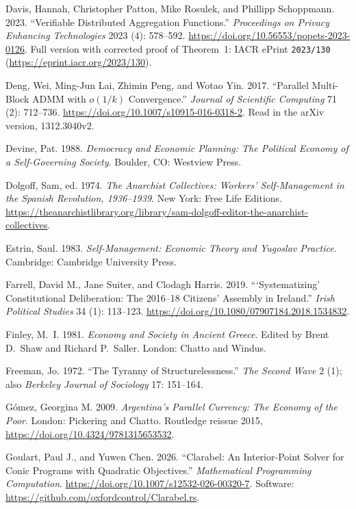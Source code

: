 \documentclass[10pt,twoside,openany]{book}
\theoremstyle{dpepstyle}
\begin{document}
\begin{list}{}{\setlength{\leftmargin}{1.8em}\setlength{\itemindent}{-1.8em}\setlength{\itemsep}{3pt}\setlength{\parsep}{0pt}}
\item Davis, Hannah, Christopher Patton, Mike Rosulek, and Phillipp Schoppmann. 2023. ``Verifiable Distributed Aggregation Functions.'' \emph{Proceedings on Privacy Enhancing Technologies} 2023 (4): 578--592. \url{https://doi.org/10.56553/popets-2023-0126}. Full version with corrected proof of Theorem~1: IACR ePrint \texttt{2023/130} (\url{https://eprint.iacr.org/2023/130}).
\item Deng, Wei, Ming-Jun Lai, Zhimin Peng, and Wotao Yin. 2017. ``Parallel Multi-Block ADMM with $o(1/k)$ Convergence.'' \emph{Journal of Scientific Computing} 71 (2): 712--736. \url{https://doi.org/10.1007/s10915-016-0318-2}. Read in the arXiv version, 1312.3040v2.
\item Devine, Pat. 1988. \emph{Democracy and Economic Planning: The Political Economy of a Self-Governing Society}. Boulder, CO: Westview Press.
\item Dolgoff, Sam, ed. 1974. \emph{The Anarchist Collectives: Workers' Self-Management in the Spanish Revolution, 1936--1939}. New York: Free Life Editions. \url{https://theanarchistlibrary.org/library/sam-dolgoff-editor-the-anarchist-collectives}.
\item Estrin, Saul. 1983. \emph{Self-Management: Economic Theory and Yugoslav Practice}. Cambridge: Cambridge University Press.
\item Farrell, David M., Jane Suiter, and Clodagh Harris. 2019. ```Systematizing' Constitutional Deliberation: The 2016--18 Citizens' Assembly in Ireland.'' \emph{Irish Political Studies} 34 (1): 113--123. \url{https://doi.org/10.1080/07907184.2018.1534832}.
\item Finley, M.~I. 1981. \emph{Economy and Society in Ancient Greece}. Edited by Brent D.\ Shaw and Richard P.\ Saller. London: Chatto and Windus.
\item Freeman, Jo. 1972. ``The Tyranny of Structurelessness.'' \emph{The Second Wave} 2 (1); also \emph{Berkeley Journal of Sociology} 17: 151--164.
\item G\'omez, Georgina M. 2009. \emph{Argentina's Parallel Currency: The Economy of the Poor}. London: Pickering and Chatto. Routledge reissue 2015, \url{https://doi.org/10.4324/9781315653532}.
\item Goulart, Paul J., and Yuwen Chen. 2026. ``Clarabel: An Interior-Point Solver for Conic Programs with Quadratic Objectives.'' \emph{Mathematical Programming Computation}. \url{https://doi.org/10.1007/s12532-026-00320-7}. Software: \url{https://github.com/oxfordcontrol/Clarabel.rs}.

\end{list}
\end{document}
